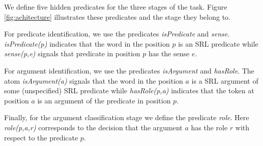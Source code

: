 


We define five hidden predicates for the three stages of the task. Figure \ref{fig:achitecture} illustrates these predicates and the stage they belong to. 

For predicate identification, we use the predicates \emph{isPredicate} and \emph{sense}. \emph{isPredicate(p)} indicates that the word in the position $p$ is an SRL predicate while \emph{sense(p,e)} signals that predicate in position $p$ has the sense $e$. %

For argument identification, we use the predicates \emph{isArgument} and \emph{hasRole}. The atom \emph{isArgument(a)} signals that the word in the position $a$ is a SRL argument of some (unspecified) SRL predicate while \emph{hasRole(p,a)} indicates that the token at position $a$ is an argument of the predicate in position $p$. 

Finally, for the argument classification stage we define the predicate \emph{role}. Here \emph{role(p,a,r)} corresponds to the decision that the argument $a$ has the role $r$ with respect to the predicate $p$.



